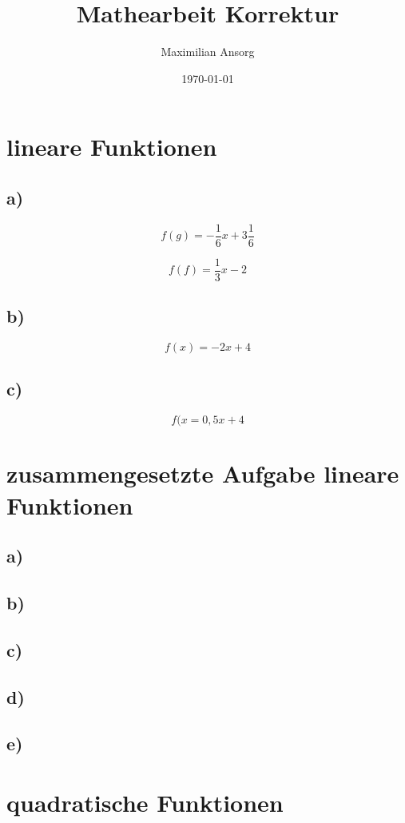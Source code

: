 \documentclass[a4paper,12pt]{scrartcl}
\title{Mathearbeit Korrektur}
\author{Maximilian Ansorg}
\date{\today}
\begin{document}
\maketitle

\section{lineare Funktionen}

\subsection*{a)}

\[f(g)=-\frac{1}{6}x+3\frac{1}{6}\]

\[f(f)=\frac{1}{3}x-2\]

\subsection*{b)}

\[f(x)=-2x+4\]

\subsection*{c)}

\[f(x=0,5x+4\]

\section{zusammengesetzte Aufgabe lineare Funktionen}

\subsection*{a)}
\subsection*{b)}
\subsection*{c)}
\subsection*{d)}
\subsection*{e)}

\section{quadratische Funktionen}
\end{document}
